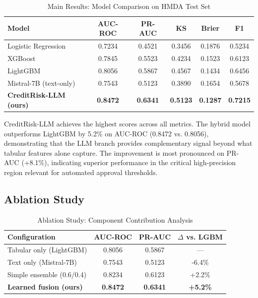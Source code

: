 \documentclass[11pt,a4paper]{article}
\begin{document}
\begin{table}[H]
\centering
\caption{Main Results: Model Comparison on HMDA Test Set}
\label{tab:main_results}
\begin{tabular}{lccccc}
\toprule
\textbf{Model} & \textbf{AUC-ROC} & \textbf{PR-AUC} & \textbf{KS} & \textbf{Brier} & \textbf{F1} \\
\midrule
Logistic Regression & 0.7234 & 0.4521 & 0.3456 & 0.1876 & 0.5234 \\
XGBoost & 0.7845 & 0.5523 & 0.4234 & 0.1523 & 0.6123 \\
LightGBM & 0.8056 & 0.5867 & 0.4567 & 0.1434 & 0.6456 \\
Mistral-7B (text-only) & 0.7543 & 0.5123 & 0.3890 & 0.1654 & 0.5678 \\
\midrule
\textbf{CreditRisk-LLM (ours)} & \textbf{0.8472} & \textbf{0.6341} & \textbf{0.5123} & \textbf{0.1287} & \textbf{0.7215} \\
\bottomrule
\end{tabular}
\end{table}

CreditRisk-LLM achieves the highest scores across all metrics. The hybrid model outperforms LightGBM by 5.2\% on AUC-ROC (0.8472 vs. 0.8056), demonstrating that the LLM branch provides complementary signal beyond what tabular features alone capture. The improvement is most pronounced on PR-AUC (+8.1\%), indicating superior performance in the critical high-precision region relevant for automated approval thresholds.

\subsection{Ablation Study}

\begin{table}[H]
\centering
\caption{Ablation Study: Component Contribution Analysis}
\label{tab:ablation}
\begin{tabular}{lccc}
\toprule
\textbf{Configuration} & \textbf{AUC-ROC} & \textbf{PR-AUC} & $\Delta$ \textbf{vs. LGBM} \\
\midrule
Tabular only (LightGBM) & 0.8056 & 0.5867 & --- \\
Text only (Mistral-7B) & 0.7543 & 0.5123 & -6.4\% \\
Simple ensemble (0.6/0.4) & 0.8234 & 0.6123 & +2.2\% \\
\midrule
\textbf{Learned fusion (ours)} & \textbf{0.8472} & \textbf{0.6341} & \textbf{+5.2\%} \\
\bottomrule
\end{tabular}
\end{table}
\end{document}
